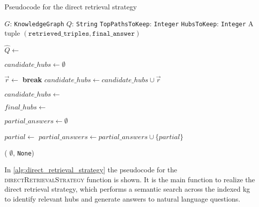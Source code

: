 \begin{algorithm}[t]
\caption{Pseudocode for the direct retrieval strategy}
\label{alg:direct_retrieval_strategy}
\begin{algorithmic}[1]
\PersistentState
    \Statex $G$: \texttt{KnowledgeGraph} 
\Require 
    \Statex $Q$: \texttt{String} 
    \Statex \texttt{TopPathsToKeep}: \texttt{Integer} 
    \Statex \texttt{HubsToKeep}: \texttt{Integer} 
\Ensure
    \Statex A tuple \((\texttt{retrieved\_triples}, \texttt{final\_answer})\)

\Statex
{}
    \State $\hat{Q} \gets$ 

    \State $candidate\_hubs \gets \emptyset$ 
    
        \State $\vec{r} \gets$ 
            \State \textbf{break}
        \EndIf
        \State $candidate\_hubs \gets candidate\_hubs \cup \vec{r}$
    \EndWhile
    
    \State $candidate\_hubs \gets$ 

    \State $final\_hubs \gets$ 

    \State $partial\_answers \gets \emptyset$
    
        \State $partial \gets$ 
        \State $partial\_answers \gets partial\_answers \cup \{partial\}$
    \EndFor
    
        \State \Return {}
    \Else
        \State \Return ( $\emptyset$, \texttt{None})
    \EndIf
    \EndFunction
\end{algorithmic}
\end{algorithm}


In \autoref{alg:direct_retrieval_strategy} the pseudocode for the \textsc{directRetrievalStrategy} function is shown. It is the main function to realize the direct retrieval strategy, which performs a semantic search across the indexed \gls{kg} to identify relevant hubs and generate answers to natural language questions.

